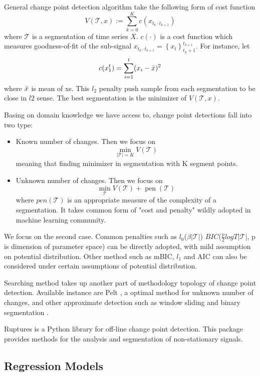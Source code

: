 \documentclass{article}
\begin{document}
General change point detection algorithm take the following form of cost function 
$$
V(\mathcal{T}, x):=\sum_{k=0}^{K} c\left(x_{t_{k} \cdot t_{k+1}}\right)
$$
where $\mathcal{T}$ is a segmentation of time series $X$. $c(\cdot)$ is a cost function which measures goodness-of-fit of the sub-signal $
x_{t_{k} \cdot t_{k+1}}=\left\{x_{t}\right\}_{t_{k}+1}^{t_{k+1}}$. For instance, let
$$
c(x_1^{t})=\sum_{i=1}^{t}(x_i-\Bar{x})^2
$$
where $\Bar{x}$ is mean of xs. This $l_2$ penalty push sample from each segmentation to be close in $l2$ sense. The best segmentation is the minimizer of $V(\mathcal{T},x)$. 

Basing on domain knowledge we have access to, change point detections fall into two type:

\begin{itemize}
    \item Known number of changes. Then we focus on 
$$
\min _{|\mathcal{T}|=K} V(\mathcal{T})
$$
 meaning that finding minimizer in segmentation with K segment points.
 \item Unknown number of changes. Then we focus on $$
\min _{\mathcal{T}} V(\mathcal{T})+\operatorname{pen}(\mathcal{T})
$$ where $pen(\mathcal{T})$ is an appropriate measure of the complexity
of a segmentation. It takes common form of "cost and penalty" wildly adopted in machine learning community. 
\end{itemize}

We focus on the second case. Common penalties such as  $l_0$\cite{10.1214/09-SS054}($\beta|\mathcal{T}|$)  $BIC$\cite{YAO1988181}($\frac{p}{2}logT|\mathcal{T}|$, p is dimension of parameter space) can be directly adopted, with mild assumption on potential distribution. Other method such as mBIC\cite{LEBARBIER2005717}, $l_1$\cite{Hocking2013} and AIC\cite{doi:10.1198/jasa.2010.tm09181} can also be considered under certain assumptions of potential distribution. 

Searching method takes up another part of methodology topology of change point detection. Available instance are Pelt \cite{doi:10.1080/01621459.2012.737745}, a optimal method for unknown number of changes, and other approximate detection such as window sliding \cite{10.1214/08-AOAS232} and binary segmentation \cite{Sen197598}. 

Ruptures\cite{Ruptures} is a Python library for off-line change point detection. This package provides methods for the analysis and segmentation of non-stationary signals.

\subsection{Regression Models}
\end{document}
